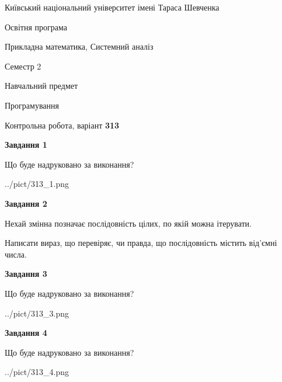\documentclass[12pt, ukrainian]{article}
\begin{document}
{{\begin {small}\par
{ \center  Київський національний університет імені Тараса Шевченка \par}
{\parbox {5 cm}{Освітня програма \hfill}{\parbox {8 cm}{Прикладна математика, Системний аналіз \hfill}}\parbox {5 cm}{\hfill Семестр 2}}\par
{\parbox {5 cm} {Навчальний предмет \hfill}\parbox {7 cm}{Програмування \hfill}\parbox {6cm}{\hfill}\par}\vspace{-7pt} \end{small}}{\center Контрольна робота, варіант  \No \textbf
{ 313 }\par}}
{
\begin {large}
{\begin {center}\textbf{Завдання 1}\end {center}}\par
Що буде надруковано за виконання?\par\par
\begin{center}
	{../pict/313_1.png}
\end{center}
\newpage

{\begin {center}\textbf{Завдання 2}\end {center}}\par
Нехай змінна  позначає послідовність цілих, по якій можна ітерувати.

Написати вираз, що перевіряє, чи правда, що послідовність  містить від’ємні числа.\par
\newpage

{\begin {center}\textbf{Завдання 3}\end {center}}\par
Що буде надруковано за виконання?
\begin{center}
	{../pict/313_3.png}
\end{center}
\newpage

{\begin {center}\textbf{Завдання 4}\end {center}}\par
Що буде надруковано за виконання?\par
\begin{center}
	{../pict/313_4.png}
\end{center}
\newpage


\end{large}}
\end{document}
